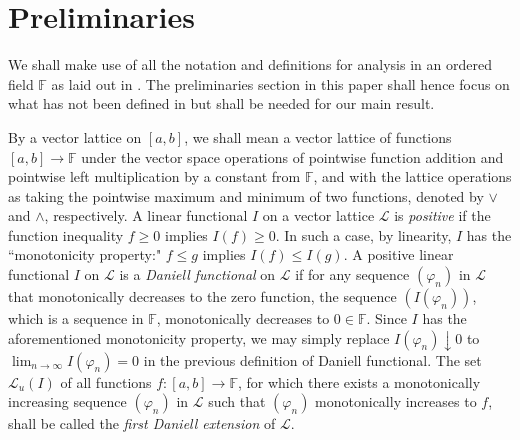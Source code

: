 \documentclass[11pt,a4paper]{article}
\def\F{\mathbb{F}}
\def\lbrak{\left[}
\def\rbrak{\right]}
\def\abClosed{\lbrak a,b\rbrak}
\def\stepLatt{\mathcal{L}}
\def\istepLatt{\stepLatt_u}
\def\into{\longrightarrow}
\def\nseqlim{{\displaystyle\lim_{n\rightarrow\infty}}}
\begin{document}
\section{Preliminaries}\label{PrelSec}

We shall make use of all the notation and definitions for analysis in an ordered field $\F$ as laid out in \cite[Section~2]{can24}. The preliminaries section in this paper shall hence focus on what has not been defined in \cite[Section~2]{can24} but shall be needed for our main result.

By a vector lattice on $\abClosed$, we shall mean a vector lattice of functions $\abClosed\into\F$ under the vector space operations of pointwise function addition and pointwise left multiplication by a constant from $\F$, and with the lattice operations as taking the pointwise maximum and minimum of two functions, denoted by $\vee$ and $\wedge$, respectively. A linear functional $I$ on a vector lattice $\stepLatt$ is \emph{positive} if the function inequality $f\geq 0$ implies $I(f)\geq 0$. In such a case, by linearity, $I$ has the ``monotonicity property:" $f\leq g$ implies $I(f)\leq I(g)$. A positive linear functional $I$ on $\stepLatt$ is a \emph{Daniell functional} on $\stepLatt$ if for any sequence $(\varphi_n)$ in $\stepLatt$ that monotonically decreases to the zero function, the sequence $(I(\varphi_n))$, which is a sequence in $\F$, monotonically decreases to $0\in\F$. Since $I$ has the aforementioned monotonicity property, we may simply replace $I(\varphi_n)\downarrow 0$ to $\nseqlim I(\varphi_n)=0$ in the previous definition of Daniell functional. The set $\istepLatt(I)$ of all functions $f:\abClosed\into\F$, for which there exists a monotonically increasing sequence $(\varphi_n)$ in $\stepLatt$ such that $(\varphi_n)$ monotonically increases to $f$, shall be called the \emph{first Daniell extension} of $\stepLatt$. 
\end{document}
